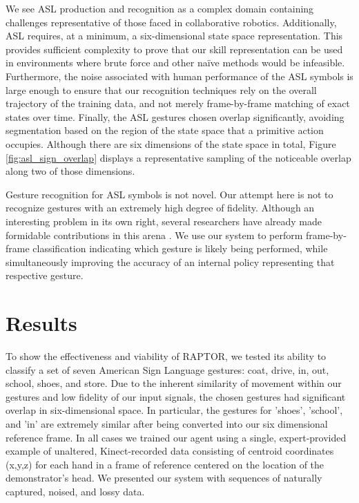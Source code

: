 \documentclass[letterpaper]{article}
\begin{document}
We see ASL production and recognition as a complex domain containing challenges representative of those faced in collaborative robotics. Additionally, ASL requires, at a minimum, a six-dimensional state space representation.  This provides sufficient complexity to prove that our skill representation can be used in environments where brute force and other na\"ive methods would be infeasible.  Furthermore, the noise associated with human performance of the ASL symbols is large enough to ensure that our recognition techniques rely on the overall trajectory of the training data, and not merely frame-by-frame matching of exact states over time.  Finally, the ASL gestures chosen overlap significantly, avoiding segmentation based on the region of the state space that a primitive action occupies. Although there are six dimensions of the state space in total, Figure \ref{fig:asl_sign_overlap} displays a representative sampling of the noticeable overlap along two of those dimensions.

Gesture recognition for ASL symbols is not novel.  Our attempt here is not to recognize gestures with an extremely high degree of fidelity.  Although an interesting problem in its own right, several researchers have already made formidable contributions in this arena \cite{HandGestures,HSMMRecognition,POMDPGesture,HoughASL,ASLRealTime,MotionASL}.  We use our system to perform frame-by-frame classification indicating which gesture is likely being performed, while simultaneously improving the accuracy of an internal policy representing that respective gesture.

\section{Results}
\label{sec:result}
To show the effectiveness and viability of RAPTOR, we tested its ability to classify a set of seven American Sign Language gestures: coat, drive, in, out, school, shoes, and store. Due to the inherent similarity of movement within our gestures and low fidelity of our input signals, the chosen gestures had significant overlap in six-dimensional space. In particular, the gestures for 'shoes', 'school', and 'in' are extremely similar after being converted into our six dimensional reference frame. In all cases we trained our agent using a single, expert-provided example of unaltered, Kinect-recorded data consisting of centroid coordinates (x,y,z) for each hand in a frame of reference centered on the location of the demonstrator's head. We presented our system with sequences of naturally captured, noised, and lossy data. 
\end{document}
